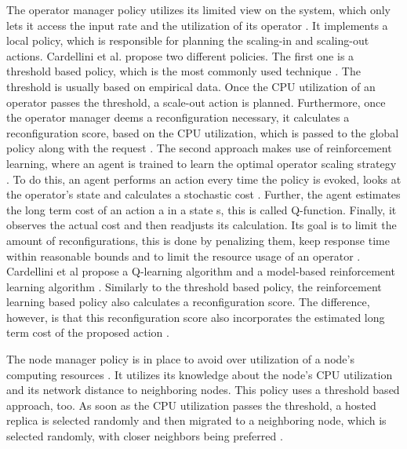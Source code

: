         \quad The operator manager policy utilizes its limited view on the system, which only lets it access the input rate and the utilization of its operator \cite[p. 176]{cardellini}.
        It implements a local policy, which is responsible for planning the scaling-in and scaling-out actions. Cardellini et al. propose two different policies.
        The first one is a threshold based policy, which is the most commonly used technique \cite[p. 177]{cardellini}. The threshold is usually based on empirical data. Once the CPU utilization 
        of an operator passes the threshold, a scale-out action is planned. 
        Furthermore, once the operator manager deems a reconfiguration necessary, it calculates a reconfiguration score, based on the CPU utilization, 
        which is passed to the global policy along with the request \cite[p. 177]{cardellini}.
        The second approach makes use of reinforcement learning, where an agent is trained to learn the optimal operator scaling strategy  \cite[p. 177]{cardellini}.
        To do this, an agent performs an action every time the policy is evoked, looks at the operator's state and calculates a stochastic cost \cite[p. 177]{cardellini}. 
        Further, the agent estimates the long term cost of an action a in a state s, this is called Q-function.
        Finally, it observes the actual cost and then readjusts its calculation.
        Its goal is to limit the amount of reconfigurations, this is done by penalizing them, keep response time within reasonable bounds and to limit the resource usage of an operator \cite[p. 177]{cardellini}.
        Cardellini et al propose a Q-learning algorithm and a model-based reinforcement learning algorithm \cite[p. 178]{cardellini}.
        Similarly to the threshold based policy, the reinforcement learning based policy also calculates a reconfiguration score. The difference, however, is that 
        this reconfiguration score also incorporates the estimated long term cost of the proposed action \cite[p. 178]{cardellini}.

        \quad The node manager policy is in place to avoid over utilization of a node's computing resources \cite[p. 179]{cardellini}. 
        It utilizes its knowledge about the node's CPU utilization and its network distance to neighboring nodes.
        This policy uses a threshold based approach, too. As soon as the CPU utilization passes the threshold, a hosted replica is selected 
        randomly and then migrated to a neighboring node, which is selected randomly, with closer neighbors being preferred \cite{cardellini}. 

